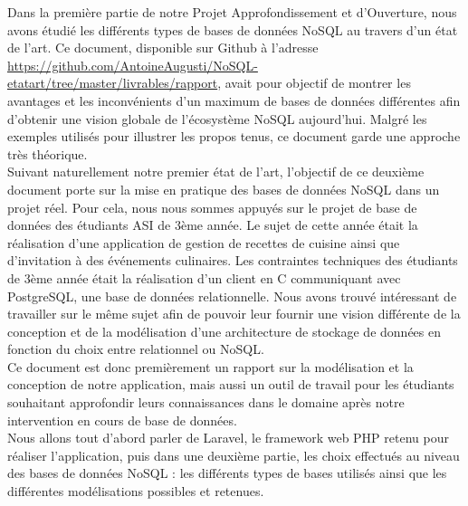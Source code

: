 Dans la première partie de notre Projet Approfondissement et d'Ouverture, nous avons étudié les différents types de bases de données NoSQL au travers d'un état de l'art. Ce document, disponible sur Github à l'adresse \url{https://github.com/AntoineAugusti/NoSQL-etatart/tree/master/livrables/rapport}, avait pour objectif de montrer les avantages et les inconvénients d'un maximum de bases de données différentes afin d'obtenir une vision globale de l'écosystème NoSQL aujourd'hui. Malgré les exemples utilisés pour illustrer les propos tenus, ce document garde une approche très théorique.\\

Suivant naturellement notre premier état de l'art, l'objectif de ce deuxième document porte sur la mise en pratique des bases de données NoSQL dans un projet réel. Pour cela, nous nous sommes appuyés sur le projet de base de données des étudiants ASI de 3ème année. Le sujet de cette année était la réalisation d'une application de gestion de recettes de cuisine ainsi que d'invitation à des événements culinaires. Les contraintes techniques des étudiants de 3ème année était la réalisation d'un client en C communiquant avec PostgreSQL, une base de données relationnelle. Nous avons trouvé intéressant de travailler sur le même sujet afin de pouvoir leur fournir une vision différente de la conception et de la modélisation d'une architecture de stockage de données en fonction du choix entre relationnel ou NoSQL.\\

Ce document est donc premièrement un rapport sur la modélisation et la conception de notre application, mais aussi un outil de travail pour les étudiants souhaitant approfondir leurs connaissances dans le domaine après notre intervention en cours de base de données.\\

Nous allons tout d'abord parler de Laravel, le framework web PHP retenu pour réaliser l'application, puis dans une deuxième partie, les choix effectués au niveau des bases de données NoSQL : les différents types de bases utilisés ainsi que les différentes modélisations possibles et retenues.